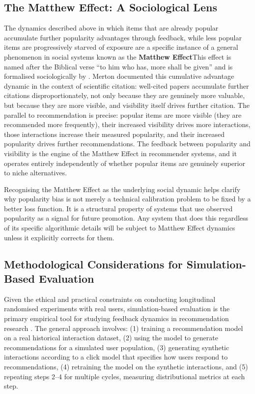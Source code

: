 \documentclass[11pt,a4paper]{report}
\begin{document}
\subsection*{The Matthew Effect: A Sociological Lens}

The dynamics described above in which items that are already popular accumulate further popularity advantages through feedback, while less popular items are progressively starved of exposure are a specific instance of a general phenomenon in social systems known as the \textbf{Matthew Effect}This effect is named after the Biblical verse ``to him who has, more shall be given'' and is formalised sociologically by \citet{merton1968social}. Merton documented this cumulative advantage dynamic in the context of scientific citation: well-cited papers accumulate further citations disproportionately, not only because they are genuinely more valuable, but because they are more visible, and visibility itself drives further citation. The parallel to recommendation is precise: popular items are more visible (they are recommended more frequently), their increased visibility drives more interactions, those interactions increase their measured popularity, and their increased popularity drives further recommendations. The feedback between popularity and visibility is the engine of the Matthew Effect in recommender systems, and it operates entirely independently of whether popular items are genuinely superior to niche alternatives.

Recognising the Matthew Effect as the underlying social dynamic helps clarify why popularity bias is not merely a technical calibration problem to be fixed by a better loss function. It is a structural property of systems that use observed popularity as a signal for future promotion. Any system that does this regardless of its specific algorithmic details will be subject to Matthew Effect dynamics unless it explicitly corrects for them.

\subsection*{Methodological Considerations for Simulation-Based Evaluation}

Given the ethical and practical constraints on conducting longitudinal randomised experiments with real users, simulation-based evaluation is the primary empirical tool for studying feedback dynamics in recommendation research \citep{chaney2018algorithmic, mansoury2020feedback, jiang2019degenerate, yao2021simulatedusers}. The general approach involves: (1) training a recommendation model on a real historical interaction dataset, (2) using the model to generate recommendations for a simulated user population, (3) generating synthetic interactions according to a click model that specifies how users respond to recommendations, (4) retraining the model on the synthetic interactions, and (5) repeating steps 2--4 for multiple cycles, measuring distributional metrics at each step.
\end{document}
